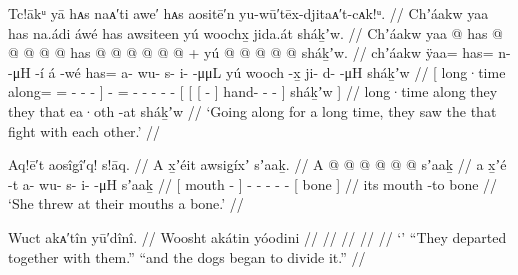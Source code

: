 \ex\label{ex:92-99-saw-shakhw}%
%
\begingl
	\glpreamble	Tc!ākᵘ yā hᴀs naᴀ′ti awe′ hᴀs aositē′n yu-wū′tēx-djitaᴀ′t-cᴀk!ᵘ. //
	\glpreamble	Chʼáakw yaa has na.ádi áwé has awsiteen yú woochx̱ jida.át sháḵʼw. //
	\gla	{} Chʼáakw yaa @ has @  @ {} @ {} @ {} {}
		 @ {}
		has @  @ {} @ {} @ {} @ {} @ {} +
		{} yú {} {}  @ {} {}  @ {} @ {} @ {} @ {} {}
			sháḵʼw. {} //
	\glb	{} chʼáakw ÿaa= has= n-  -μH -í {}
		á -wé
		has= a- wu- s- i-  -μμL
		{} yú {} {} wooch -x̱ {} ji- d-  -μH {} {}
			sháḵʼw {} //
	\glc	{}[ long·time along= = -
			 - - {}]
		 -
		= - - - -  -
		{}[  {}[ {}[  - {}]
			hand- -  - \· {}]
			sháḵʼw {}] //
	\gld	{} long·time along they  {} {} {} {}
		 {}
		they  {} {} {} {} {}
		{} that {} {} ea·oth -at {}  {} {} {} {} {}
			sháḵʼw {} //
	\glft	‘Going along for a long time, they saw the  that fight with each other.’
		//
\endgl
\xe

\ex\label{ex:92-100-threw-bone}%
%
\begingl
	\glpreamble	Aq!ē′t aosîg̣î′q! s!āq. //
	\glpreamble	A x̱ʼéit awsig̱íxʼ sʼaaḵ. //
	\gla	{} A  @ {} {}
		 @ {} @ {} @ {} @ {} @ {}
		{} sʼaaḵ {} //
	\glb	{} a x̱ʼé -t {}
		a- wu- s- i-  -μH
		{} sʼaaḵ {} //
	\glc	{}[  mouth - {}]
		- - - -  -
		{}[ bone {}] //
	\gld	{} its mouth -to {}
		 {} {} {} {} {}
		{} bone {} //
	\glft	‘She threw at their mouths a bone.’
		//
\endgl
\xe

\ex\label{ex:92-101-}%
%
\begingl
	\glpreamble	Wuct akᴀ′tîn yū′dînî. //
	\glpreamble	Woosht akátin yóodini //
	\gla	 //
	\glb	 //
	\glc	 //
	\gld	 //
	\glft	‘’\newline
		“They departed together with them.”\newline
		“and the dogs began to divide it.”
		//
\endgl
\xe

